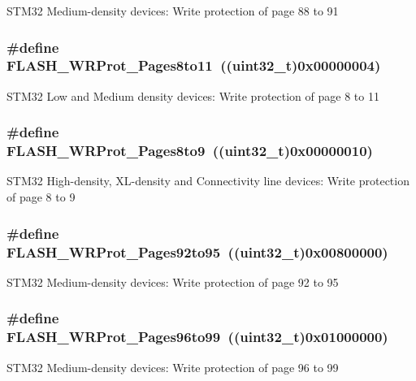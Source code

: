 STM32 Medium-\/density devices: Write protection of page 88 to 91 \hypertarget{group__Option__Bytes__Write__Protection_ga7eca7a8b11accdd6dadf3445847e1a57}{
\subsubsection[{FLASH\_\-WRProt\_\-Pages8to11}]{\setlength{\rightskip}{0pt plus 5cm}\#define FLASH\_\-WRProt\_\-Pages8to11~((uint32\_\-t)0x00000004)}}
\label{group__Option__Bytes__Write__Protection_ga7eca7a8b11accdd6dadf3445847e1a57}
STM32 Low and Medium density devices: Write protection of page 8 to 11 \hypertarget{group__Option__Bytes__Write__Protection_ga72f231c0fe953f3cd43cf421c2626f90}{
\subsubsection[{FLASH\_\-WRProt\_\-Pages8to9}]{\setlength{\rightskip}{0pt plus 5cm}\#define FLASH\_\-WRProt\_\-Pages8to9~((uint32\_\-t)0x00000010)}}
\label{group__Option__Bytes__Write__Protection_ga72f231c0fe953f3cd43cf421c2626f90}
STM32 High-\/density, XL-\/density and Connectivity line devices: Write protection of page 8 to 9 \hypertarget{group__Option__Bytes__Write__Protection_gab7d95c1f574523ef827bafd01a64b0bb}{
\subsubsection[{FLASH\_\-WRProt\_\-Pages92to95}]{\setlength{\rightskip}{0pt plus 5cm}\#define FLASH\_\-WRProt\_\-Pages92to95~((uint32\_\-t)0x00800000)}}
\label{group__Option__Bytes__Write__Protection_gab7d95c1f574523ef827bafd01a64b0bb}
STM32 Medium-\/density devices: Write protection of page 92 to 95 \hypertarget{group__Option__Bytes__Write__Protection_ga8f3ea488c33b3e209cab996545f55c49}{
\subsubsection[{FLASH\_\-WRProt\_\-Pages96to99}]{\setlength{\rightskip}{0pt plus 5cm}\#define FLASH\_\-WRProt\_\-Pages96to99~((uint32\_\-t)0x01000000)}}
\label{group__Option__Bytes__Write__Protection_ga8f3ea488c33b3e209cab996545f55c49}
STM32 Medium-\/density devices: Write protection of page 96 to 99 